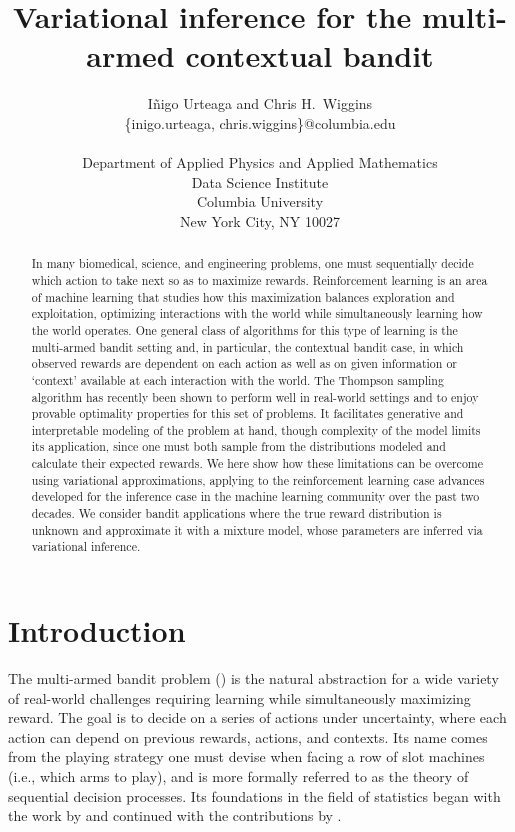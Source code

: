 \documentclass[10pt]{article}
\title{Variational inference for the multi-armed contextual bandit}
\author{ I\~{n}igo Urteaga and Chris H.~Wiggins\\
	{\sf \{inigo.urteaga, chris.wiggins\}@columbia.edu} \\\\
  Department of Applied Physics and Applied Mathematics\\
	Data Science Institute\\
	Columbia University\\
	New York City, NY 10027
}
\newcommand{\ie}{i.e., }
\begin{document}
\maketitle

\begin{abstract}
In many biomedical, science, and engineering problems, one must sequentially decide which action to take next so as to maximize rewards. Reinforcement learning is an area of machine learning that studies how this maximization balances exploration and exploitation, optimizing interactions with the world while simultaneously learning how the world operates. One general class of algorithms for this type of learning is the multi-armed bandit setting and, in particular, the contextual bandit case, in which observed rewards are dependent on each action as well as on given information or `context' available at each interaction with the world. The Thompson sampling algorithm has recently been shown to perform well in real-world settings and to enjoy provable optimality properties for this set of problems. It facilitates  generative and interpretable modeling of the problem at hand, though complexity of the model limits its application, since one must both sample from the distributions modeled and calculate their expected rewards. We here show how these limitations can be overcome using variational approximations, applying to the reinforcement learning case advances developed for the inference case in the machine learning community over the past two decades. We consider bandit applications where the true reward distribution is unknown and approximate it with a mixture model, whose parameters are inferred via variational inference.
\end{abstract}

\section{Introduction}
\label{sec:introduction}

The multi-armed bandit problem (\cite{b-Sutton1998,j-Ghavamzadeh2015}) is the natural abstraction for a wide variety of real-world challenges requiring learning while simultaneously maximizing reward. The goal is to decide on a series of actions under uncertainty, where each action can depend on previous rewards, actions, and contexts. Its name comes from the playing strategy one must devise when facing a row of slot machines (\ie which arms to play), and is more formally referred to as the theory of sequential decision processes. Its foundations in the field of statistics began with the work by \cite{j-Thompson1933,j-Thompson1935} and continued with the contributions by \cite{j-Robbins1952}.
\end{document}
